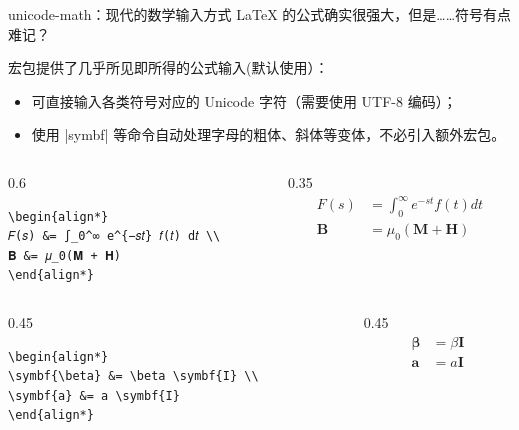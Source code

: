 \begin{frame}[fragile,label={frame:unicode-math}]{unicode-math：现代的数学输入方式}
\LaTeX{} 的公式确实很强大，但是……符号有点难记？

 宏包提供了几乎所见即所得的公式输入(\ThuThesis 默认使用）：

\begin{itemize}
  \item 可直接输入各类符号对应的 Unicode 字符（需要使用 UTF-8 编码）；
  \item 使用 |symbf| 等命令自动处理字母的粗体、斜体等变体，不必引入额外宏包。
\end{itemize}

\begin{columns}[c]
  \begin{column}{0.6\textwidth}
    \begin{lstlisting}[basicstyle=\small\unimathcodefont]
\begin{align*}
𝐹(𝑠) &= ∫_0^∞ e^{−𝑠𝑡} 𝑓(𝑡) d𝑡 \\
𝐁 &= 𝜇_0(𝐌 + 𝐇)
\end{align*}
    \end{lstlisting}
  \end{column}
  \begin{column}{0.35\textwidth}
  \begin{align*}
    𝐹(𝑠) &= ∫_0^∞ e^{−𝑠𝑡} 𝑓(𝑡) d𝑡 \\
    𝐁 &= 𝜇_0(𝐌 + 𝐇)
  \end{align*}
  \end{column}
\end{columns}

\begin{columns}[c]
  \begin{column}{0.45\textwidth}
    \begin{lstlisting}[basicstyle=\small\unimathcodefont]
\begin{align*}
\symbf{\beta} &= \beta \symbf{I} \\
\symbf{a} &= a \symbf{I}
\end{align*}
\end{lstlisting}
\end{column}\hspace{1em}
  \begin{column}{0.45\textwidth}
  \begin{align*}
      \symbf{\beta} &= \beta \symbf{I} \\
      \symbf{a} &= a \symbf{I}
  \end{align*}
  \end{column}
\end{columns}

\end{frame}




